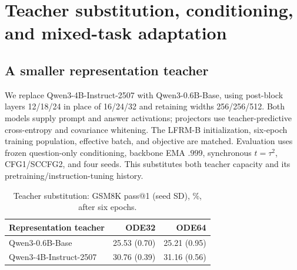 \documentclass{article}
\newenvironment{revision}{\begingroup\color{blue}}{\endgroup}
\begin{document}
\clearpage
\begin{revision}
\section{Teacher substitution, conditioning, and mixed-task adaptation}
\label{app:teachertransfer}
\subsection{A smaller representation teacher}
We replace Qwen3-4B-Instruct-2507 with Qwen3-0.6B-Base, using post-block layers 12/18/24 in place of 16/24/32 and retaining widths 256/256/512. Both models supply prompt and answer activations; projectors use teacher-predictive cross-entropy and covariance whitening. The LFRM-B initialization, six-epoch training population, effective batch, and objective are matched. Evaluation uses frozen question-only conditioning, backbone EMA $.999$, synchronous $t=\tau^2$, CFG1/SCCFG2, and four seeds. This substitutes both teacher capacity and its pretraining/instruction-tuning history.
\begin{table}[htbp]\color{blue}\centering\small
\caption{Teacher substitution: GSM8K pass@1 (seed SD), \%, after six epochs.}
\label{tab:teachersubstitution}
\begin{tabular}{@{}lrr@{}}\toprule
Representation teacher & ODE32 & ODE64\\\midrule
Qwen3-0.6B-Base & 25.53 (0.70) & 25.21 (0.95)\\
Qwen3-4B-Instruct-2507 & 30.76 (0.39) & 31.16 (0.56)\\\bottomrule
\end{tabular}
\end{table}


\end{revision}
\end{document}
